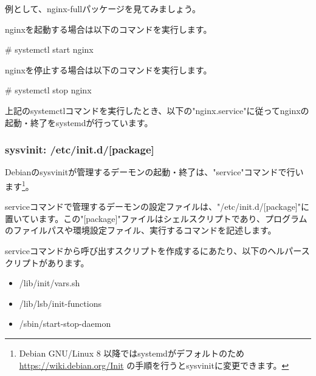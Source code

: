 \documentclass[mingoth,a4paper]{jsarticle}
\begin{document}
例として、nginx-fullパッケージを見てみましょう。


nginxを起動する場合は以下のコマンドを実行します。

\begin{commandline}
# systemctl start nginx
\end{commandline}

nginxを停止する場合は以下のコマンドを実行します。

\begin{commandline}
# systemctl stop nginx
\end{commandline}


上記のsystemctlコマンドを実行したとき、以下の"nginx.service"に従ってnginxの起動・終了をsystemdが行っています。




\subsubsection{sysvinit: /etc/init.d/[package]}

Debianのsysvinitが管理するデーモンの起動・終了は、"service"コマンドで行います\footnote{Debian GNU/Linux 8 以降ではsystemdがデフォルトのため \url{https://wiki.debian.org/Init} の手順を行うとsysvinitに変更できます。}。


serviceコマンドで管理するデーモンの設定ファイルは、"/etc/init.d/[package]"に置いています。この"[package]"ファイルはシェルスクリプトであり、プログラムのファイルパスや環境設定ファイル、実行するコマンドを記述します。


serviceコマンドから呼び出すスクリプトを作成するにあたり、以下のヘルパースクリプトがあります。

\begin{itemize}
  \item /lib/init/vars.sh
  \item /lib/lsb/init-functions
  \item /sbin/start-stop-daemon
\end{itemize}
\end{document}
